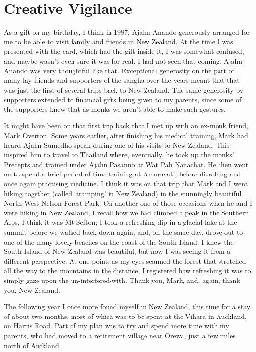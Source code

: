 \chapter{Creative Vigilance}

As a gift on my birthday, I think in 1987, Ajahn Anando generously
arranged for me to be able to visit family and friends in New Zealand.
At the time I was presented with the card, which had the gift inside it,
I was somewhat confused, and maybe wasn't even sure it was for real. I
had not seen that coming. Ajahn Anando was very thoughtful like that.
Exceptional generosity on the part of many lay friends and supporters of
the sangha over the years meant that that was just the first of several
trips back to New Zealand. The same generosity by supporters extended to
financial gifts being given to my parents, since some of the supporters
knew that as monks we aren't able to make such gestures.

It might have been on that first trip back that I met up with an ex-monk
friend, Mark Overton. Some years earlier, after finishing his medical
training, Mark had heard Ajahn Sumedho speak during one of his visits to
New Zealand. This inspired him to travel to Thailand where, eventually,
he took up the monks' Precepts and trained under Ajahn Pasanno at Wat
Pah Nanachat. He then went on to spend a brief period of time training
at Amaravati, before disrobing and once again practising medicine. I
think it was on that trip that Mark and I went hiking together (called
`tramping' in New Zealand) in the stunningly beautiful North West Nelson
Forest Park. On another one of those occasions when he and I were hiking
in New Zealand, I recall how we had climbed a peak in the Southern Alps,
I think it was Mt Sefton; I took a refreshing dip in a glacial lake at
the summit before we walked back down again, and, on the same day, drove
out to one of the many lovely beaches on the coast of the South Island.
I knew the South Island of New Zealand was beautiful, but now I was
seeing it from a different perspective. At one point, as my eyes scanned
the forest that stretched all the way to the mountains in the distance,
I registered how refreshing it was to simply gaze upon the
un-interfered-with. Thank you, Mark, and, again, thank you, New Zealand.

The following year I once more found myself in New Zealand, this time
for a stay of about two months, most of which was to be spent at the
Vihara in Auckland, on Harris Road. Part of my plan was to try and spend
more time with my parents, who had moved to a retirement village near
Orewa, just a few miles north of Auckland.

